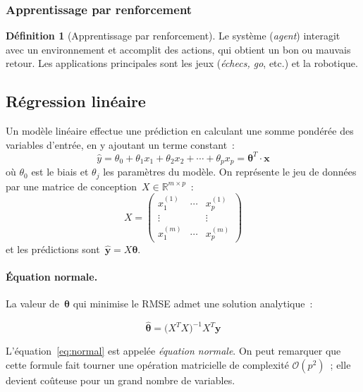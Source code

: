 \documentclass[a4paper,12pt,twoside]{report}
\theoremstyle{definition}
\newtheorem{defi}{Définition}
\theoremstyle{plain}
\theoremstyle{remark}
\newcommand{\rv}[1]{\boldsymbol{#1}}
\newcommand{\R}{\mathbb{R}}
\begin{document}
\subsubsection*{Apprentissage par renforcement}

\begin{defi}[Apprentissage par renforcement]
Le système (\textit{agent}) interagit avec un environnement et accomplit des actions, qui
obtient un bon ou mauvais retour. Les applications principales sont les jeux
(\textit{échecs, go}, etc.) et la robotique.
\end{defi}

\subsection{Régression linéaire}
\label{subsec:regression_lineaire}

Un modèle linéaire effectue une prédiction en calculant une somme pondérée des variables
d'entrée, en y ajoutant un terme constant~:
\[
\hat{y} = \theta_0 + \theta_1 x_1 + \theta_2 x_2 + \cdots + \theta_p x_p
       = \rv{\theta}^T \cdot \rv{x}
\]
où $\theta_0$ est le biais et $\theta_j$ les paramètres du modèle. On représente le jeu de
données par une matrice de conception~$X \in \R^{m \times p}$~:
\[
X =
\begin{pmatrix}
x_1^{(1)} & \cdots & x_p^{(1)} \\
\vdots    &        & \vdots    \\
x_1^{(m)} & \cdots & x_p^{(m)}
\end{pmatrix}
\]
et les prédictions sont~$\hat{\rv{y}} = X\rv{\theta}$.

\paragraph{Équation normale.}

La valeur de~$\rv{\theta}$ qui minimise le \ac{RMSE} admet une solution analytique~:

\begin{equation}
\hat{\rv{\theta}} = \bigl(X^T X\bigr)^{-1} X^T \rv{y}
\label{eq:normal}
\end{equation}

L'équation~\eqref{eq:normal} est appelée \emph{équation normale}. On peut remarquer que
cette formule fait tourner une opération matricielle de complexité $\mathcal{O}(p^2)$~;
elle devient coûteuse pour un grand nombre de variables.
\end{document}
